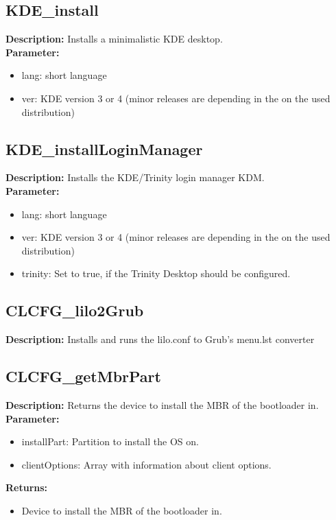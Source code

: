 \subsection{KDE\_install}
\textbf{Description:} Installs a minimalistic KDE desktop.\\
\textbf{Parameter:}
\begin{itemize}
\item lang: short language
\item ver: KDE version 3 or 4 (minor releases are depending in the on the used distribution)
\end{itemize}

\subsection{KDE\_installLoginManager}
\textbf{Description:} Installs the KDE/Trinity login manager KDM.\\
\textbf{Parameter:}
\begin{itemize}
\item lang: short language
\item ver: KDE version 3 or 4 (minor releases are depending in the on the used distribution)
\item trinity: Set to true, if the Trinity Desktop should be configured.
\end{itemize}

\subsection{CLCFG\_lilo2Grub}
\textbf{Description:} Installs and runs the lilo.conf to Grub's menu.lst converter\\

\subsection{CLCFG\_getMbrPart}
\textbf{Description:} Returns the device to install the MBR of the bootloader in.\\
\textbf{Parameter:}
\begin{itemize}
\item installPart: Partition to install the OS on.
\item clientOptions: Array with information about client options.
\end{itemize}
\textbf{Returns:}
\begin{itemize}
\item Device to install the MBR of the bootloader in.
\end{itemize}

